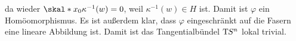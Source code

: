 da wieder $\skal*{x_0}{\kappa ^{-1}(w)}=0$, weil $\kappa ^{-1}(w) \in H$ ist. Damit ist $\varphi$ ein Homöomorphismus. Es ist außerdem klar, dass $\varphi$ eingeschränkt auf 
die Fasern eine lineare Abbildung ist. Damit ist das Tangentialbündel $\mathrm{T}\mkern-0.85mu S^n$ lokal trivial. \bewende








\cleardoubleoddemptypage
{}
\setcounter{page}{1}

\printindex
\listoffigures
\todototoc
{}
